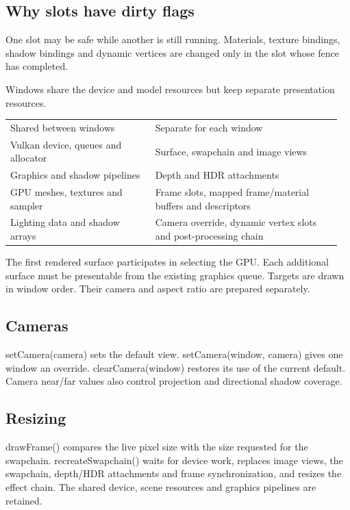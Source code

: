 \documentclass[11pt,a4paper]{article}
\begin{document}
\subsection*{Why slots have dirty flags}
One slot may be safe while another is still running. Materials, texture bindings, shadow bindings and dynamic vertices are changed only in the slot whose fence has completed.

\label{core-43}
Windows share the device and model resources but keep separate presentation resources.

{\small
\begin{longtable}{@{}p{0.42\linewidth}p{0.54\linewidth}@{}}
Shared between windows & Separate for each window \\
Vulkan device, queues and allocator & Surface, swapchain and image views \\
Graphics and shadow pipelines & Depth and HDR attachments \\
GPU meshes, textures and sampler & Frame slots, mapped frame/material buffers and descriptors \\
Lighting data and shadow arrays & Camera override, dynamic vertex slots and post-processing chain \\
\end{longtable}
}

The first rendered surface participates in selecting the GPU. Each additional surface must be presentable from the existing graphics queue. Targets are drawn in window order. Their camera and aspect ratio are prepared separately.

\subsection*{Cameras}
setCamera(camera) sets the default view. setCamera(window, camera) gives one window an override. clearCamera(window) restores its use of the current default. Camera near/far values also control projection and directional shadow coverage.

\subsection*{Resizing}
drawFrame() compares the live pixel size with the size requested for the swapchain. recreateSwapchain() waits for device work, replaces image views, the swapchain, depth/HDR attachments and frame synchronization, and resizes the effect chain. The shared device, scene resources and graphics pipelines are retained.
\end{document}
